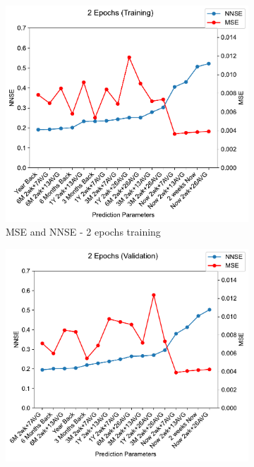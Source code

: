 \documentclass[11pt,twocolumn]{article}
\begin{document}
\begin{figure}[p]
     \centering
     \begin{subfigure}[b]{0.49\textwidth}
        \centering\includegraphics[width=1.0\linewidth]{images/2_training-MSE-and-NNSE.pdf}
        \caption{MSE and NNSE - 2 epochs training}
        \label{fig:tbd1}
     \end{subfigure}
     \hfill
     \begin{subfigure}[b]{0.49\textwidth}
        \centering\includegraphics[width=1.0\linewidth]{images/2_validation-MSE-and-NNSE.pdf}

\end{subfigure}
\end{figure}
\end{document}

